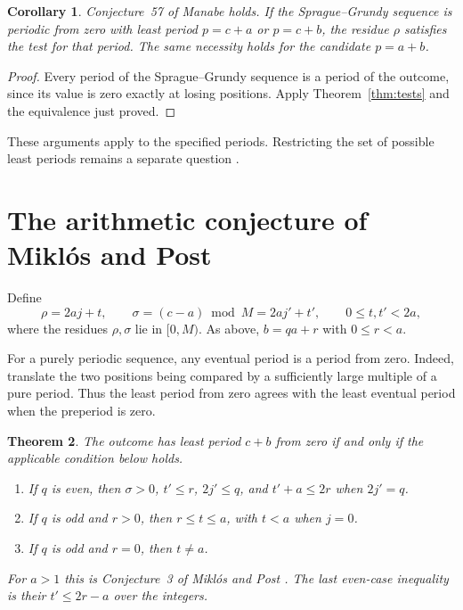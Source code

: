\documentclass[11pt]{article}
\newtheorem{theorem}{Theorem}
\newtheorem{corollary}[theorem]{Corollary}
\begin{document}
\begin{corollary}
Conjecture~57 of Manabe \cite[\S6]{manabe} holds. If the Sprague--Grundy
sequence is periodic from zero with least period $p=c+a$ or $p=c+b$,
the residue $\rho$ satisfies the test for that period.
The same necessity holds for the candidate $p=a+b$.
\end{corollary}

\begin{proof}
Every period of the Sprague--Grundy sequence is a period of the
outcome, since its value is zero exactly at losing positions.
Apply Theorem~\ref{thm:tests} and the equivalence just proved.
\end{proof}

These arguments apply to the specified periods. Restricting the
set of possible least periods remains a separate question
\cite[Conjecture~56]{manabe}.

\section{The arithmetic conjecture of Mikl\'os and Post}\label{sec:arithmetic}

Define
\[
 \rho=2aj+t,\qquad \sigma=(c-a)\bmod M=2aj'+t',
 \qquad 0\le t,t'<2a,
\]
where the residues $\rho,\sigma$ lie in $[0,M)$. As above,
$b=qa+r$ with $0\le r<a$.

For a purely periodic sequence, any eventual period is a period
from zero. Indeed, translate the two positions being compared by a
sufficiently large multiple of a pure period. Thus the least period
from zero agrees with the least eventual period when the preperiod is zero.

\begin{theorem}\label{thm:arithmetic}
The outcome has least period $c+b$ from zero if and only if the
applicable condition below holds.
\begin{enumerate}
 \setlength{\itemsep}{0pt}
 \item If $q$ is even, then
 $\sigma>0$, $t'\le r$, $2j'\le q$, and
 $t'+a\le 2r$ when $2j'=q$.
 \item If $q$ is odd and $r>0$, then
 $r\le t\le a$, with $t<a$ when $j=0$.
 \item If $q$ is odd and $r=0$, then $t\ne a$.
\end{enumerate}
For $a>1$ this is Conjecture~3 of Mikl\'os and Post \cite[\S7]{miklos-post}.
The last even-case inequality is their $t'\le 2r-a$ over the integers.
\end{theorem}
\end{document}
